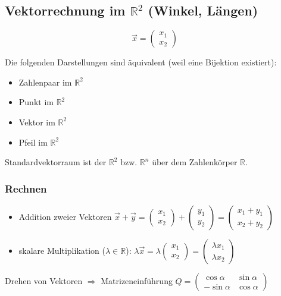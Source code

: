 \subsection{Vektorrechnung im $\mathbb{R}^2$ (Winkel, Längen)}
\begin{definition}[Vektor]
	\[\vec{x} = \begin{pmatrix}x_1 \\ x_2\end{pmatrix}\]
\end{definition}
\noindent Die folgenden Darstellungen sind äquivalent (weil eine Bijektion existiert):
\begin{itemize}
	\item Zahlenpaar im $\mathbb{R}^2$
	\item Punkt im $\mathbb{R}^2$
	\item Vektor im $\mathbb{R}^2$
	\item Pfeil im $\mathbb{R}^2$
\end{itemize}
%
Standardvektorraum ist der $\mathbb{R}^2$ bzw. $\mathbb{R}^n$ über dem Zahlenkörper $\mathbb{R}$.

\subsubsection*{Rechnen}
\begin{itemize}
	\item Addition zweier Vektoren $\vec{x} + \vec{y} = \begin{pmatrix}x_1 \\ x_2\end{pmatrix} + \begin{pmatrix}y_1 \\ y_2\end{pmatrix} = \begin{pmatrix}x_1 + y_1 \\ x_2 + y_2\end{pmatrix}$
	\item skalare Multiplikation ($\lambda \in \mathbb{R}$): $\lambda \vec{x} = \lambda \begin{pmatrix}x_1 \\ x_2\end{pmatrix} = \begin{pmatrix}\lambda x_1 \\ \lambda x_2\end{pmatrix}$
\end{itemize}
\begin{note}
	Drehen von Vektoren $\Rightarrow$ Matrizeneinführung $Q = \begin{pmatrix}\cos \alpha & \sin \alpha \\ -\sin \alpha & \cos \alpha\end{pmatrix}$
\end{note}
